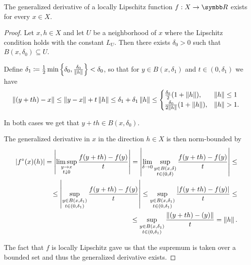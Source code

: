 \begin{proposition}\label{thm:clarke_derivative_exists}
  The generalized derivative of a locally Lipschitz function \( f: X \to \BB{R} \) exists for every \( x \in X \).
\end{proposition}
\begin{proof}
  Let \( x, h \in X \) and let \( U \) be a neighborhood of \( x \) where the Lipschitz condition holds with the constant \( L_U \). Then there exists \( \delta_0 > 0 \) such that \( B(x, \delta_0) \subseteq U \).

  Define \( \delta_1 \coloneqq \frac 1 2 \min \left\{\delta_0, \frac {\delta_0} {\left\Vert h \right\Vert} \right\} < \delta_0 \), so that for \( y \in B(x, \delta_1) \) and \( t \in (0, \delta_1) \) we have
  \begin{align*}
    \left\Vert (y + th) - x \right\Vert
    \leq
    \left\Vert y - x \right\Vert + t \left\Vert h \right\Vert
    \leq
    \delta_1 + \delta_1 \left\Vert h \right\Vert
    \leq
    \begin{cases}
      \frac {\delta_0} 2 (1 + \left\Vert h \right\Vert), &\left\Vert h \right\Vert \leq 1 \\
      \frac {\delta_0} {2 \left\Vert h \right\Vert} (1 + \left\Vert h \right\Vert), &\left\Vert h \right\Vert > 1.
    \end{cases}
  \end{align*}

  In both cases we get that \( y + th \in B(x, \delta_0) \).

  The generalized derivative in \( x \) in the direction \( h \in X \) is then norm-bounded by
  \begin{align*}
    \left\vert f^\circ(x)(h) \right\vert
    =
    \left\vert \limsup_{\substack{y \to x \\ t \downarrow 0}} \frac {f(y + th) - f(y)} t \right\vert
    =
    \left\vert \lim_{\delta \to 0} \sup_{\substack{y \in B(x, \delta) \\ t \in (0, \delta)}} \frac {f(y + th) - f(y)} t \right\vert
    \leq \\ \leq
    \left\vert \sup_{\substack{y \in B(x, \delta_1) \\ t \in (0, \delta_1)}} \frac {f(y + th) - f(y)} t \right\vert
    \leq
    \sup_{\substack{y \in B(x, \delta_1) \\ t \in (0, \delta_1)}} \frac {\left\vert f(y + th) - f(y) \right\vert} t
    \leq \\ \leq
    \sup_{\substack{y \in B(x, \delta_1) \\ t \in (0, \delta_1)}} \frac {\left\Vert (y + th) - (y) \right\Vert} t
    =
    \left\Vert h \right\Vert.
  \end{align*}

  The fact that \( f \) is locally Lipschitz gave us that the supremum is taken over a bounded set and thus the generalized derivative exists.
\end{proof}
